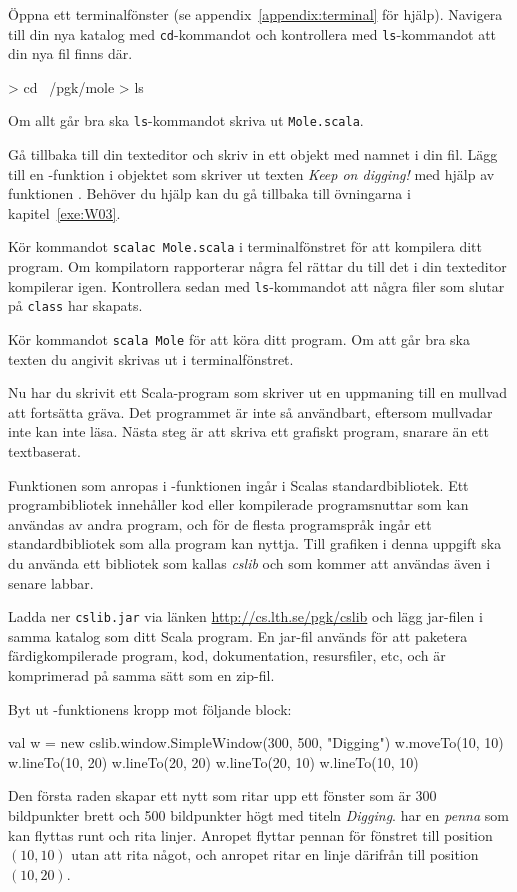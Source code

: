 \Subtask
Öppna ett terminalfönster (se appendix~\ref{appendix:terminal} för hjälp).
Navigera till din nya katalog med \texttt{cd}-kommandot  och kontrollera med \texttt{ls}-kommandot  att din nya fil finns där.
\begin{REPLnonum}
> cd ~/pgk/mole
> ls
\end{REPLnonum}
Om allt går bra ska \texttt{ls}-kommandot skriva ut \texttt{Mole.scala}.

\Subtask
Gå tillbaka till din texteditor och skriv in ett objekt med namnet  i din fil.
Lägg till en -funktion i objektet som skriver ut texten \emph{Keep on digging!} med hjälp av funktionen .
Behöver du hjälp kan du gå tillbaka till övningarna i kapitel~\ref{exe:W03}.

\Subtask
Kör kommandot \texttt{scalac Mole.scala} i terminalfönstret för att kompilera ditt program.
Om kompilatorn rapporterar några fel rättar du till det i din texteditor kompilerar igen.
Kontrollera sedan med \texttt{ls}-kommandot att några filer som slutar på \texttt{class} har skapats.

\Subtask
Kör kommandot \texttt{scala Mole} för att köra ditt program.
Om att går bra ska texten du angivit skrivas ut i terminalfönstret.


\Task
Nu har du skrivit ett Scala-program som skriver ut en uppmaning till en mullvad att fortsätta gräva.
Det programmet är inte så användbart, eftersom mullvadar inte kan inte läsa.
Nästa steg är att skriva ett grafiskt program, snarare än ett textbaserat.

Funktionen  som anropas i -funktionen ingår i Scalas standardbibliotek.
Ett programbibliotek innehåller kod eller kompilerade programsnuttar som kan användas av andra program, och för de flesta programspråk ingår ett standardbibliotek som alla program kan nyttja.
Till grafiken i denna uppgift ska du använda ett bibliotek som kallas \emph{cslib} och som kommer att användas även i senare labbar.

\Subtask

Ladda ner \texttt{cslib.jar} via länken \url{http://cs.lth.se/pgk/cslib} och lägg jar-filen i samma katalog som ditt Scala program.
En jar-fil används för att paketera färdigkompilerade program, kod, dokumentation, resursfiler, etc, och är komprimerad på samma sätt som en zip-fil.

\Subtask
Byt ut -funktionens kropp mot följande block:
\begin{Code}
{
	val w = new cslib.window.SimpleWindow(300, 500, "Digging")
	w.moveTo(10, 10)
	w.lineTo(10, 20)
	w.lineTo(20, 20)
	w.lineTo(20, 10)
	w.lineTo(10, 10)
}
\end{Code}
Den första raden skapar ett nytt  som ritar upp ett fönster som är 300 bildpunkter brett och 500 bildpunkter högt med titeln \emph{Digging}.
 har en \emph{penna} som kan flyttas runt och rita linjer.
Anropet  flyttar pennan för fönstret  till position $(10,10)$ utan att rita något, och anropet  ritar en linje därifrån till position $(10, 20)$.


